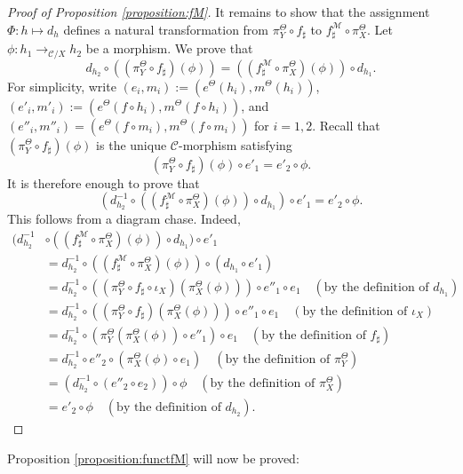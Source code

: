 \documentclass[12pt, a4paper]{amsart}
\theoremstyle{definition}
\begin{document}
\begin{proof}[Proof of Proposition \ref{proposition:fM}]
It remains to show that the assignment $\Phi : h \mapsto d_h$ defines a natural transformation from $\pi^\Theta_Y \circ f_\sharp$ to $f^\mathcal{M}_\sharp \circ \pi^\Theta_X$. Let $\phi : h_1 \rightarrow_{\mathcal{C}/X} h_2$ be a morphism. We prove that
\[
d_{h_2} \circ ((\pi_Y^\Theta \circ f_\sharp)(\phi)) = ((f^\mathcal{M}_\sharp \circ \pi^\Theta_X)(\phi)) \circ d_{h_1}.
\]
For simplicity, write $(e_i,m_i) := (e^\Theta(h_i), m^\Theta(h_i))$, $(e'_i,m'_i) := (e^\Theta(f \circ h_i), m^\Theta(f \circ h_i))$, and $(e''_i,m''_i) = (e^\Theta(f \circ m_i),m^\Theta(f \circ m_i))$ for $i=1,2$. Recall that $(\pi_Y^\Theta \circ f_\sharp)(\phi)$ is the unique $\mathcal{C}$-morphism satisfying
\[
(\pi_Y^\Theta \circ f_\sharp)(\phi) \circ e'_1 = e'_2 \circ \phi.
\]
It is therefore enough to prove that
\[
(d_{h_2}^{-1} \circ ((f^\mathcal{M}_\sharp \circ \pi^\Theta_X)(\phi)) \circ d_{h_1}) \circ e'_1 = e'_2 \circ \phi.
\]
This follows from a diagram chase. Indeed,
\begin{align*}
(d_{h_2}^{-1} &\circ ((f^\mathcal{M}_\sharp \circ \pi^\Theta_X)(\phi)) \circ d_{h_1}) \circ e'_1 \\
    &= d_{h_2}^{-1} \circ ((f^\mathcal{M}_\sharp \circ \pi^\Theta_X)(\phi)) \circ (d_{h_1} \circ e'_1) \\
    &= d_{h_2}^{-1} \circ ((\pi_Y^\Theta \circ f_\sharp \circ \iota_X)(\pi^\Theta_X(\phi))) \circ e''_1 \circ e_1 \quad (\text{by the definition of } d_{h_1}) \\
    &= d_{h_2}^{-1} \circ ((\pi_Y^\Theta \circ f_\sharp)(\pi^\Theta_X(\phi))) \circ e''_1 \circ e_1 \quad (\text{by the definition of } \iota_X) \\
    &= d_{h_2}^{-1} \circ (\pi_Y^\Theta(\pi^\Theta_X(\phi)) \circ e''_1) \circ e_1 \quad (\text{by the definition of } f_\sharp) \\
    &= d_{h_2}^{-1} \circ e''_2 \circ (\pi^\Theta_X(\phi) \circ e_1) \quad (\text{by the definition of } \pi^\Theta_Y) \\
    &= (d_{h_2}^{-1} \circ (e''_2 \circ e_2)) \circ \phi \quad (\text{by the definition of } \pi^\Theta_X) \\
    &= e'_2 \circ \phi \quad (\text{by the definition of } d_{h_2}).
\end{align*}
\end{proof}

Proposition \ref{proposition:functfM} will now be proved:
\end{document}
